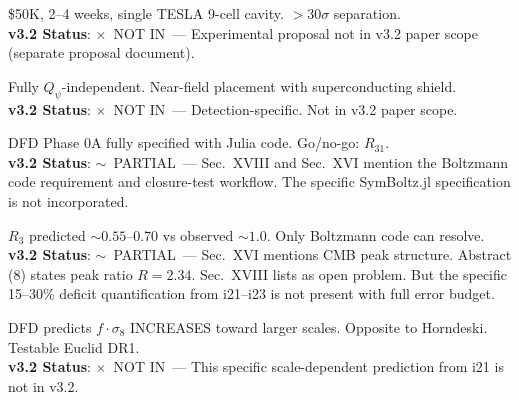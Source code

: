 \documentclass[11pt,a4paper]{article}
\newcommand{\vpartial}{\textcolor{statusPARTIAL}{$\sim$~PARTIAL}}
\newcommand{\vnot}{\textcolor{statusNOT}{$\times$~NOT IN}}
\begin{document}
\begin{tcolorbox}[colback=technical!5,colframe=technical,title=\textbf{F50: SQMS Phase 0 Pathfinder Protocol}]
\$50K, 2--4 weeks, single TESLA 9-cell cavity. $>30\sigma$ separation.\\
\textbf{v3.2 Status}: \vnot\ --- Experimental proposal not in v3.2 paper scope (separate proposal document).
\end{tcolorbox}

\begin{tcolorbox}[colback=technical!5,colframe=technical,title=\textbf{F51: DC Gradient MEMS: $|\lambda-1| \sim 10^{-14}$ to $10^{-16}$}]
Fully $Q_\psi$-independent. Near-field placement with superconducting shield.\\
\textbf{v3.2 Status}: \vnot\ --- Detection-specific. Not in v3.2 paper scope.
\end{tcolorbox}

\begin{tcolorbox}[colback=technical!5,colframe=technical,title=\textbf{F52: SymBoltz.jl Published --- Phase 0A Specified}]
DFD Phase 0A fully specified with Julia code. Go/no-go: $R_{31}$.\\
\textbf{v3.2 Status}: \vpartial\ --- Sec.~XVIII and Sec.~XVI mention the Boltzmann code requirement and closure-test workflow. The specific SymBoltz.jl specification is not incorporated.
\end{tcolorbox}

\begin{tcolorbox}[colback=technical!5,colframe=technical,title=\textbf{F53: CMB Third Peak 15--30\% Deficit (Critical Open Tension)}]
$R_3$ predicted $\sim 0.55$--0.70 vs observed $\sim 1.0$. Only Boltzmann code can resolve.\\
\textbf{v3.2 Status}: \vpartial\ --- Sec.~XVI mentions CMB peak structure. Abstract (8) states peak ratio $R = 2.34$. Sec.~XVIII lists as open problem. But the specific 15--30\% deficit quantification from i21--i23 is not present with full error budget.
\end{tcolorbox}

\begin{tcolorbox}[colback=technical!5,colframe=technical,title=\textbf{F54: Scale-Dependent $f \cdot \sigma_8(k,z)$ Prediction (P25)}]
DFD predicts $f \cdot \sigma_8$ INCREASES toward larger scales. Opposite to Horndeski. Testable Euclid DR1.\\
\textbf{v3.2 Status}: \vnot\ --- This specific scale-dependent prediction from i21 is not in v3.2.
\end{tcolorbox}
\end{document}
